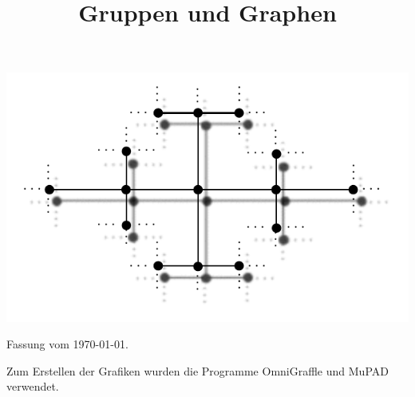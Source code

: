 \documentclass[a4paper, 12pt, twoside]{article}
\title{\Huge \textbf{
\textsf{Gruppen und Graphen}}}
\date{}
\begin{document}
\maketitle
\begin{center}
	\includegraphics{grugraImages/titel}
\end{center}
\newpage
\tableofcontents

\newpage

\renewcommand{\thepage}{\roman{page}} 

\newpage \thispagestyle{empty}
{\footnotesize
{}
Fassung vom \today.

Zum Erstellen der Grafiken wurden die Programme {\sf OmniGraffle} und
{\sf MuPAD} verwendet.
}
\cleardoublepage

\tableofcontents
\cleardoublepage

\setcounter{page}{1} %
\renewcommand{\thepage}{\arabic{page}} 

\cleardoublepage


\cleardoublepage


\cleardoublepage


\cleardoublepage


\cleardoublepage


\end{document}
